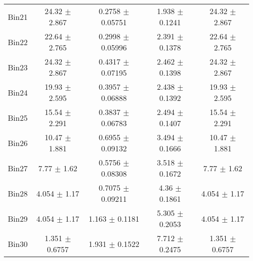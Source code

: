 \begin{tabular}{@{\extracolsep{4pt}}lcccc@{}}
     Bin21 & 24.32 $\pm$ 2.867 & 0.2758 $\pm$ 0.05751 & 1.938 $\pm$ 0.1241 & 24.32 $\pm$ 2.867 \\ 
     Bin22 & 22.64 $\pm$ 2.765 & 0.2998 $\pm$ 0.05996 & 2.391 $\pm$ 0.1378 & 22.64 $\pm$ 2.765 \\ 
     Bin23 & 24.32 $\pm$ 2.867 & 0.4317 $\pm$ 0.07195 & 2.462 $\pm$ 0.1398 & 24.32 $\pm$ 2.867 \\ 
     Bin24 & 19.93 $\pm$ 2.595 & 0.3957 $\pm$ 0.06888 & 2.438 $\pm$ 0.1392 & 19.93 $\pm$ 2.595 \\ 
     Bin25 & 15.54 $\pm$ 2.291 & 0.3837 $\pm$ 0.06783 & 2.494 $\pm$ 0.1407 & 15.54 $\pm$ 2.291 \\ 
     Bin26 & 10.47 $\pm$ 1.881 & 0.6955 $\pm$ 0.09132 & 3.494 $\pm$ 0.1666 & 10.47 $\pm$ 1.881 \\ 
     Bin27 & 7.77 $\pm$ 1.62 & 0.5756 $\pm$ 0.08308 & 3.518 $\pm$ 0.1672 & 7.77 $\pm$ 1.62 \\ 
     Bin28 & 4.054 $\pm$ 1.17 & 0.7075 $\pm$ 0.09211 & 4.36 $\pm$ 0.1861 & 4.054 $\pm$ 1.17 \\ 
     Bin29 & 4.054 $\pm$ 1.17 & 1.163 $\pm$ 0.1181 & 5.305 $\pm$ 0.2053 & 4.054 $\pm$ 1.17 \\ 
     Bin30 & 1.351 $\pm$ 0.6757 & 1.931 $\pm$ 0.1522 & 7.712 $\pm$ 0.2475 & 1.351 $\pm$ 0.6757 \\ 
\hline\hline
  \end{tabular}
